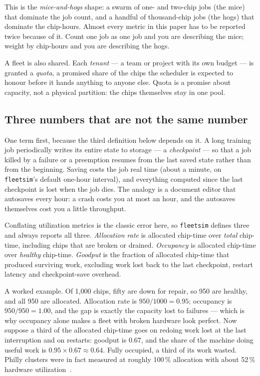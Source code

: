 This is the \emph{mice-and-hogs} shape: a swarm of one- and two-chip jobs (the
mice) that dominate the job count, and a handful of thousand-chip jobs (the
hogs) that dominate the chip-hours. Almost every metric in this paper has to be
reported twice because of it. Count one job as one job and you are describing
the mice; weight by chip-hours and you are describing the hogs.

A fleet is also shared. Each \emph{tenant} --- a team or project with its own
budget --- is granted a \emph{quota}, a promised share of the chips the
scheduler is expected to honour before it hands anything to anyone else. Quota
is a promise about capacity, not a physical partition: the chips themselves stay
in one pool.

\subsection{Three numbers that are not the same number}
\label{sec:threenumbers}

One term first, because the third definition below depends on it. A long
training job periodically writes its entire state to storage --- a
\emph{checkpoint} --- so that a job killed by a failure or a preemption resumes
from the last saved state rather than from the beginning. Saving costs the job
real time (about a minute, on \texttt{fleetsim}'s default one-hour interval),
and everything computed since the last checkpoint is lost when the job dies. The
analogy is a document editor that autosaves every hour: a crash costs you at
most an hour, and the autosaves themselves cost you a little throughput.

Conflating utilization metrics is the classic error here, so \texttt{fleetsim}
defines three and always reports all three. \emph{Allocation rate} is allocated
chip-time over \emph{total} chip-time, including chips that are broken or
drained. \emph{Occupancy} is allocated chip-time over \emph{healthy} chip-time.
\emph{Goodput} is the fraction of allocated chip-time that produced surviving
work, excluding work lost back to the last checkpoint, restart latency and
checkpoint-save overhead.

A worked example. Of 1{,}000 chips, fifty are down for repair, so 950 are
healthy, and all 950 are allocated. Allocation rate is $950/1000 = 0.95$;
occupancy is $950/950 = 1.00$, and the gap is exactly the capacity lost to
failures --- which is why occupancy alone makes a fleet with broken hardware look
perfect. Now suppose a third of the allocated chip-time goes on redoing work lost
at the last interruption and on restarts: goodput is $0.67$, and the share of the
machine doing useful work is $0.95 \times 0.67 \approx 0.64$. Fully occupied, a
third of its work wasted. Philly clusters were in fact measured at roughly
100\,\% allocation with about 52\,\% hardware utilization~\cite{philly2019}.

